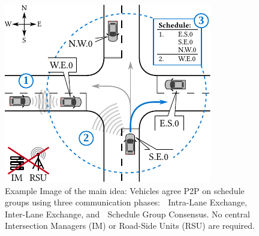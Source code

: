 	\newcommand\circnum[1]{\textcolor{col_prim}{\textcircled{\raisebox{-0.9pt}{#1}}}}
	\begin{figure}[t]
	  \centering
	  \includegraphics[width=\columnwidth]{res/img/idea}
	  \caption{Example Image of the main idea: Vehicles agree P2P on schedule groups using three communication phases: \circnum{1} Intra-Lane Exchange, \circnum{2} Inter-Lane Exchange, and \circnum{3} Schedule Group Consensus. No central Intersection Managers (IM) or Road-Side Units (RSU) are required.}
	  \label{fig:idea}
	\end{figure}

